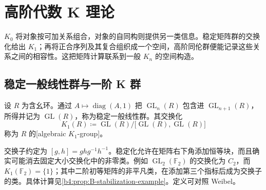 
\section{高阶代数 K 理论}
\label{b4:sec:B03}

\(K_0\) 将对象按可加关系组合，对象的自同构则提供另一类信息。稳定矩阵群的交换化给出 \(K_1\)；再将正合序列及其复合组织成一个空间，高阶同伦群便能记录这些关系之间的相容性。这把矩阵计算联系到一般 \(K_n\) 的空间构造。

\subsection{稳定一般线性群与一阶 K 群}
\label{b4:subsec:B03:01}

\begin{definition}\label{b4:def:B-k1}
	设 \(R\) 为含幺环。通过 \(A\mapsto\operatorname{diag}(A,1)\) 把 \(\operatorname{GL}_n(R)\) 包含进 \(\operatorname{GL}_{n+1}(R)\)，所得并记为 \(\operatorname{GL}(R)\)，称为稳定一般线性群。其交换化
	\[
		K_1(R)\coloneqq \operatorname{GL}(R)/\bigl[\operatorname{GL}(R),\operatorname{GL}(R)\bigr]
	\]
	称为 \(R\) 的[algebraic \(K_1\)-group]。
\end{definition}

交换子约定为 \([g,h]=ghg^{-1}h^{-1}\)。稳定化允许在矩阵右下角添加恒等块，而且确实可能消去固定大小交换化中的非零类。例如 \(\operatorname{GL}_2(\mathbb F_2)\) 的交换化为 \(C_2\)，而 \(K_1(\mathbb F_2)=\{1\}\)；其中二阶初等矩阵的非平凡类，在添加第三个指标后成为交换子的类。具体计算见\cref{b4:prop:B-stabilization-example}。定义可对照 Weibel\cite[Chapter III, Definition 1.1]{Weibel2013KBook}。

